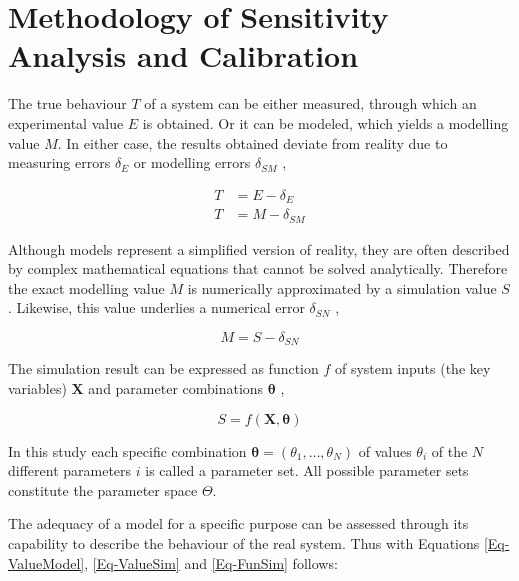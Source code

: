 

\section{Methodology of Sensitivity Analysis and Calibration}
\label{Sec-SAnaCal}

The true behaviour $T$ of a system can be either measured, through which an experimental value $E$ is obtained. Or it can be modeled, which yields a modelling value $M$. In either case, the results obtained deviate from reality due to measuring errors $\delta_E$ or modelling errors $\delta_{SM}$ \parencite{Stern.2001},

\begin{align}
    T & =  E - \delta_E \label{Eq-ValueEx} \\
    T & =  M - \delta_{SM} \label{Eq-ValueModel}
\end{align}

Although models represent a simplified version of reality, they are often described by complex mathematical equations that cannot be solved analytically. Therefore the exact modelling value $M$ is numerically approximated by a simulation value $S$. Likewise, this value underlies a numerical error $\delta_{SN}$ \parencite{Stern.2001},

\begin{equation}
    \label{Eq-ValueSim}
    M = S - \delta_{SN}
\end{equation}

The simulation result can be expressed as function $f$ of system inputs (the key variables) $\bm{X}$ and parameter combinations $\bm{\theta}$ \parencite{Naeini.2019},

\begin{equation}
    \label{Eq-FunSim}
    S = f(\bm{X},\bm{\theta})
\end{equation}

In this study each specific combination $\bm{\theta} = ( \theta_1,\dots,\theta_N)$ of values $\theta_i$ of the $N$ different parameters $i$ is called a parameter set. All possible parameter sets constitute the parameter space $\Theta$.

The adequacy of a model for a specific purpose can be assessed through its capability to describe the behaviour of the real system. Thus with Equations \eqref{Eq-ValueModel}, \eqref{Eq-ValueSim} and \eqref{Eq-FunSim} follows:

